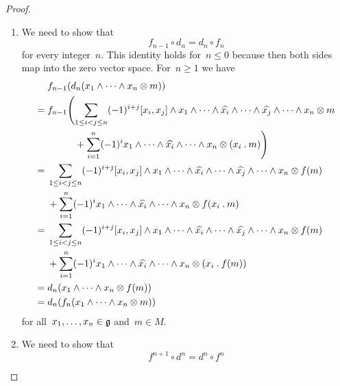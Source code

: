 \begin{proof}
  \leavevmode
  \begin{enumerate}
    \item
      We need to show that
      \[
        f_{n-1} \circ d_n
        =
        d_n \circ f_n
      \]
      for every integer~$n$.
      This identity holds for~$n \leq 0$ because then both sides map into the zero vector space.
      For~$n \geq 1$ we have
      \begin{align*}
        {}&
        f_{n-1}( d_n( x_1 \wedge \dotsb \wedge x_n \otimes m ) )
        \\
        ={}&
        f_{n-1}
        \Biggl(
          \sum_{1 \leq i < j \leq n}
          (-1)^{i + j}
          [x_i, x_j] \wedge x_1 \wedge \dotsb \wedge \widehat{x_i} \wedge \dotsb \wedge \widehat{x_j} \wedge \dotsb \wedge x_n \otimes m
        \\
        {}&
          \phantom{
            f_{n-1}
            \Biggl(
          }
          +
          \sum_{i=1}^n
          (-1)^i
          x_1 \wedge \dotsb \wedge \widehat{x_i} \wedge \dotsb \wedge x_n \otimes (x_i \act m)
        \Biggr)
        \\
        ={}&
        \sum_{1 \leq i < j \leq n}
        (-1)^{i + j}
        [x_i, x_j] \wedge x_1 \wedge \dotsb \wedge \widehat{x_i} \wedge \dotsb \wedge \widehat{x_j} \wedge \dotsb \wedge x_n \otimes f(m)
        \\
        {}&
        +
        \sum_{i=1}^n
        (-1)^i
        x_1 \wedge \dotsb \wedge \widehat{x_i} \wedge \dotsb \wedge x_n \otimes f(x_i \act m)
        \\
        ={}&
        \sum_{1 \leq i < j \leq n}
        (-1)^{i + j}
        [x_i, x_j] \wedge x_1 \wedge \dotsb \wedge \widehat{x_i} \wedge \dotsb \wedge \widehat{x_j} \wedge \dotsb \wedge x_n \otimes f(m)
        \\
        {}&
        +
        \sum_{i=1}^n
        (-1)^i
        x_1 \wedge \dotsb \wedge \widehat{x_i} \wedge \dotsb \wedge x_n \otimes ( x_i \act f(m) )
        \\
        ={}&
        d_n( x_1 \wedge \dotsb \wedge x_n \otimes f(m) )
        \\
        ={}&
        d_n( f_n( x_1 \wedge \dotsb \wedge x_n \otimes m ) )
      \end{align*}
      for all~$x_1, \dotsc, x_n \in \mathfrak{g}$ and~$m \in M$.
    \item
      We need to show that
      \[
        f^{n+1} \circ d^n
        =
        d^n \circ f^n
      \]

\end{enumerate}
\end{proof}
